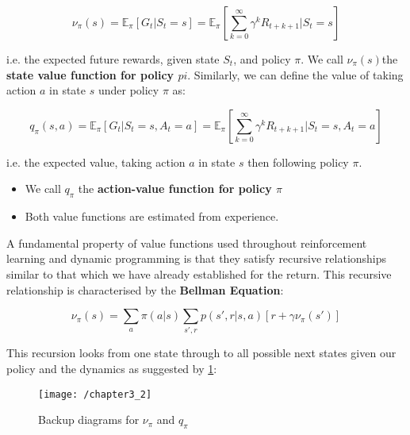 \begin{equation}
\nu_\pi(s) = \mathbb{E}_\pi \left[G_t | S_t = s \right] = \mathbb{E}_\pi \left[\sum_{k=0}^{\infty} \gamma^k R_{t+k+1} | S_t = s\right]
\end{equation}

i.e. the expected future rewards, given state \(S_t\), and policy \(\pi\). We call \(\nu_\pi(s)\)the \textbf{state value function for policy \(pi\)}. Similarly, we can define the value of taking action \(a\) in state \(s\) under policy \(\pi\) as:

\begin{equation}
q_\pi(s,a) = \mathbb{E}_\pi \left[G_t | S_t = s, A_t = a \right] = \mathbb{E}_\pi \left[\sum_{k=0}^{\infty} \gamma^k R_{t+k+1} | S_t = s, A_t = a \right]
\end{equation}

i.e. the expected value, taking action \(a\) in state \(s\) then following policy \(\pi\).
\begin{itemize}
\item We call \(q_\pi\) the \textbf{action-value function for policy \(\pi\)}
\item Both value functions are estimated from experience.
\end{itemize}

A fundamental property of value functions used throughout reinforcement learning and dynamic programming is that they satisfy recursive relationships similar to that which we have already established for the return. This recursive relationship is characterised by the \textbf{Bellman Equation}:

\begin{equation}
\nu_\pi(s) = \sum_{a} \pi(a|s) \sum_{s',r} p(s', r | s, a) \left[r + \gamma \nu_\pi(s')\right]
\end{equation}

This recursion looks from one state through to all possible next states given our policy and the dynamics as suggested by \ref{fig:backup}:

\begin{figure}[h!]
	\centering
	\texttt{[image: /chapter3\_2]}
	\caption{Backup diagrams for \(\nu_\pi\) and \(q_\pi\)}
	\label{fig:backup}
\end{figure}

